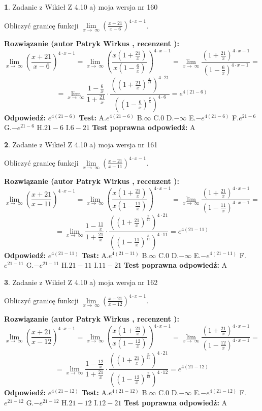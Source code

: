 \documentclass[12pt, a4paper]{article}
\theoremstyle{definition} %
\newtheorem{zad}{}
\newcommand{\zadStart}[1]{\begin{zad}#1\newline}
\newcommand{\zadStop}{\end{zad}}
\newcommand{\rozwStart}[2]{\noindent \textbf{Rozwiązanie (autor #1 , recenzent #2): }\newline}
\newcommand{\rozwStop}{\newline}
\newcommand{\odpStart}{\noindent \textbf{Odpowiedź:}\newline}
\newcommand{\odpStop}{\newline}
\newcommand{\testStart}{\noindent \textbf{Test:}\newline}
\newcommand{\testStop}{\newline}
\newcommand{\kluczStart}{\noindent \textbf{Test poprawna odpowiedź:}\newline}
\newcommand{\kluczStop}{\newline}
\begin{document}
\zadStart{Zadanie z Wikieł Z 4.10 a) moja wersja nr 160}


Obliczyć granicę funkcji  $\lim\limits_{x\to\ \infty}(\frac{x+21}{x-6})^{4\cdot x-1}$.
\zadStop
\rozwStart{Patryk Wirkus}{}
$$\lim\limits_{x\to\ \infty}(\frac{x+21}{x-6})^{4\cdot x-1} = \lim\limits_{x\to\ \infty}(\frac{x(1+\frac{21}{x})}{x(1-\frac{6}{x})})^{4\cdot x-1}=\lim\limits_{x\to\ \infty}\frac{(1+\frac{21}{x})^{4\cdot x-1}}{(1-\frac{6}{x})^{4\cdot x-1}}=$$
$$=\lim\limits_{x\to\ \infty}\frac{1-\frac{6}{x}}{1+\frac{21}{x}}\cdot\frac{((1+\frac{21}{x})^{\frac{x}{21}})^{4\cdot21}}{((1-\frac{6}{x})^{\frac{x}{6}})^{4\cdot6}}=e^{4(21-6)}$$
\rozwStop
\odpStart
$e^{4(21-6)}$
\odpStop
\testStart
A.$e^{4(21-6)}$ B.$\infty$ C.$0$ D.$-\infty$ E.$-e^{4(21-6)}$
F.$e^{21-6}$ G.$-e^{21-6}$
H.$21-6$
I.$6-21$
\testStop
\kluczStart
A
\kluczStop



\zadStart{Zadanie z Wikieł Z 4.10 a) moja wersja nr 161}


Obliczyć granicę funkcji  $\lim\limits_{x\to\ \infty}(\frac{x+21}{x-11})^{4\cdot x-1}$.
\zadStop
\rozwStart{Patryk Wirkus}{}
$$\lim\limits_{x\to\ \infty}(\frac{x+21}{x-11})^{4\cdot x-1} = \lim\limits_{x\to\ \infty}(\frac{x(1+\frac{21}{x})}{x(1-\frac{11}{x})})^{4\cdot x-1}=\lim\limits_{x\to\ \infty}\frac{(1+\frac{21}{x})^{4\cdot x-1}}{(1-\frac{11}{x})^{4\cdot x-1}}=$$
$$=\lim\limits_{x\to\ \infty}\frac{1-\frac{11}{x}}{1+\frac{21}{x}}\cdot\frac{((1+\frac{21}{x})^{\frac{x}{21}})^{4\cdot21}}{((1-\frac{11}{x})^{\frac{x}{11}})^{4\cdot11}}=e^{4(21-11)}$$
\rozwStop
\odpStart
$e^{4(21-11)}$
\odpStop
\testStart
A.$e^{4(21-11)}$ B.$\infty$ C.$0$ D.$-\infty$ E.$-e^{4(21-11)}$
F.$e^{21-11}$ G.$-e^{21-11}$
H.$21-11$
I.$11-21$
\testStop
\kluczStart
A
\kluczStop



\zadStart{Zadanie z Wikieł Z 4.10 a) moja wersja nr 162}


Obliczyć granicę funkcji  $\lim\limits_{x\to\ \infty}(\frac{x+21}{x-12})^{4\cdot x-1}$.
\zadStop
\rozwStart{Patryk Wirkus}{}
$$\lim\limits_{x\to\ \infty}(\frac{x+21}{x-12})^{4\cdot x-1} = \lim\limits_{x\to\ \infty}(\frac{x(1+\frac{21}{x})}{x(1-\frac{12}{x})})^{4\cdot x-1}=\lim\limits_{x\to\ \infty}\frac{(1+\frac{21}{x})^{4\cdot x-1}}{(1-\frac{12}{x})^{4\cdot x-1}}=$$
$$=\lim\limits_{x\to\ \infty}\frac{1-\frac{12}{x}}{1+\frac{21}{x}}\cdot\frac{((1+\frac{21}{x})^{\frac{x}{21}})^{4\cdot21}}{((1-\frac{12}{x})^{\frac{x}{12}})^{4\cdot12}}=e^{4(21-12)}$$
\rozwStop
\odpStart
$e^{4(21-12)}$
\odpStop
\testStart
A.$e^{4(21-12)}$ B.$\infty$ C.$0$ D.$-\infty$ E.$-e^{4(21-12)}$
F.$e^{21-12}$ G.$-e^{21-12}$
H.$21-12$
I.$12-21$
\testStop
\kluczStart
A
\kluczStop
\end{document}
